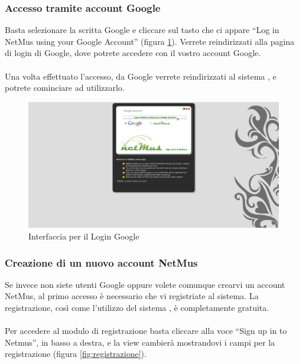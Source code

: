 \newpage
\subsubsection*{Accesso tramite account Google}
Basta selezionare la scritta Google e cliccare sul tasto che ci appare ``Log in
NetMus using your Google Account'' (figura \ref{fig:loginGoogle}). Verrete
reindirizzati alla pagina di login di Google, dove potrete accedere con il
vostro account Google.\\
\\
Una volta effettuato l'accesso, da Google verrete reindirizzati al sistema
, e potrete cominciare ad utilizzarlo.

\vspace{1cm}
\begin{figure}[!htbp]
  \centering
  \includegraphics[width=14cm]{img/MU/loginGoogle.png}
\caption{Interfaccia per il Login Google}
\label{fig:loginGoogle}
\end{figure}

\newpage
\subsubsection*{Creazione di un nuovo account NetMus}
Se invece non siete utenti Google oppure volete comunque crearvi un account
NetMus, al primo accesso \`e necessario che vi registriate al
sistema. La registrazione, cos\`i come l'utilizzo del sistema ,
\`e completamente gratuita.\\
\\
Per accedere al modulo di registrazione basta cliccare alla voce ``Sign up in to
Netmus'', in basso a destra, e la view cambier\`a mostrandovi i campi per la
registrazione (figura \ref{fig:registrazione}).


